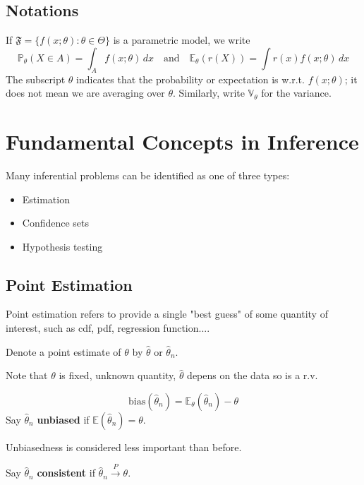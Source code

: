 \subsection{Notations}

If $\mathfrak{ F}=\{ f(x;\theta):\theta\in\Theta \}$ is a parametric model, we write
\[
\mathbb{P}_{\theta}(X\in A)=\int_{A}^{} f(x;\theta) \, dx \quad \text{and}\quad \mathbb{E}_{\theta}(r(X))=\int r(x)f(x;\theta) \, dx
\]
The subscript $\theta$ indicates that the probability or expectation is w.r.t. $f(x;\theta)$; it does not mean we are averaging over $\theta$. Similarly, write $\mathbb{V}_{\theta}$ for the variance.

\section{Fundamental Concepts in Inference}

Many inferential problems can be identified as one of three types:

\begin{itemize}
	\item Estimation
	\item Confidence sets
	\item Hypothesis testing
\end{itemize}

\subsection{Point Estimation}

Point estimation refers to provide a single "best guess" of some quantity of interest, such as cdf, pdf, regression function....

Denote a point estimate of $\theta$ by $\widehat{\theta}$ or $\widehat{\theta}_n$.

\begin{remark}
Note that $\theta$ is fixed, unknown quantity, $\widehat{\theta}$ depens on the data so is a r.v.
\end{remark}
\[
\text{bias}(\widehat{\theta}_n)=\mathbb{E}_{\theta}(\widehat{\theta}_n)-\theta
\]
Say $\widehat{\theta}_n$ \textbf{unbiased} if $\mathbb{E}(\widehat{\theta}_n)=\theta$.

\begin{note}
Unbiasedness is considered less important than before.
\end{note}
Say $\widehat{\theta}_n$ \textbf{consistent} if $\widehat{\theta}_n\overset{ P }{ \to }\theta$.

